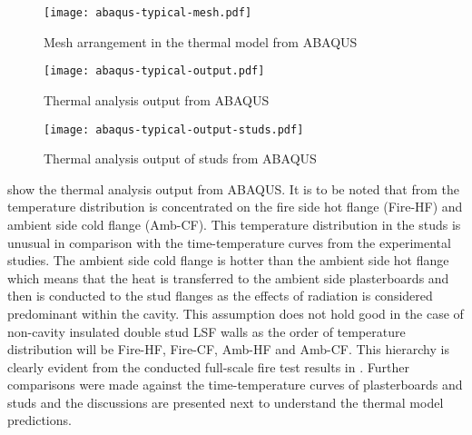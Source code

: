 \begin{figure}[!htbp]
	\centering
		\texttt{[image: abaqus-typical-mesh.pdf]}
		\caption{Mesh arrangement in the thermal model from ABAQUS}
		\label{fig:abaqus-typical-mesh-thermal}
\end{figure}
\begin{figure}[!htbp]
	\centering
		\texttt{[image: abaqus-typical-output.pdf]}
		\caption{Thermal analysis output from ABAQUS}
		\label{fig:abaqus-typical-output}
\end{figure}
\begin{figure}[!htbp]
	\centering
		\texttt{[image: abaqus-typical-output-studs.pdf]}
		\caption{Thermal analysis output of studs from ABAQUS}
		\label{fig:abaqus-typical-output-studs}
\end{figure}

 show the thermal analysis output from ABAQUS. It is to be noted that from  the temperature distribution is concentrated on the fire side hot flange (Fire-HF) and ambient side cold flange (Amb-CF). This temperature distribution in the studs is unusual in comparison with the time-temperature curves from the experimental studies. The ambient side cold flange is hotter than the ambient side hot flange which means that the heat is transferred to the ambient side plasterboards and then is conducted to the stud flanges as the effects of radiation is considered predominant within the cavity. This assumption does not hold good in the case of non-cavity insulated double stud LSF walls as the order of temperature distribution will be Fire-HF, Fire-CF, Amb-HF and Amb-CF. This hierarchy is clearly evident from the conducted full-scale fire test results in . Further comparisons were made against the time-temperature curves of plasterboards and studs and the discussions are presented next to understand the thermal model predictions.

